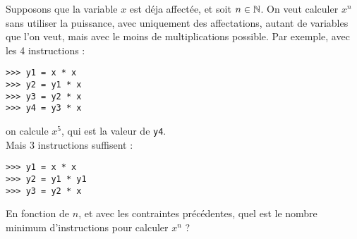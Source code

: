 Supposons que la variable $x$ est déja affectée, et soit $n\in\mathbb{N}$. On veut calculer $x^n$ sans 
utiliser la puissance, avec uniquement des affectations, autant de variables que l'on veut, mais 
avec le moins de multiplications possible. Par exemple, avec les 4 instructions :
\begin{lstlisting}
>>> y1 = x * x
>>> y2 = y1 * x
>>> y3 = y2 * x
>>> y4 = y3 * x
\end{lstlisting}

on calcule $x^5$, qui est la valeur de \texttt{y4}.\\
Mais 3 instructions suffisent :
\begin{lstlisting}
>>> y1 = x * x
>>> y2 = y1 * y1
>>> y3 = y2 * x
\end{lstlisting}

En fonction de $n$, et avec les contraintes précédentes, quel est le nombre minimum d'instructions
pour calculer $x^n$ ?